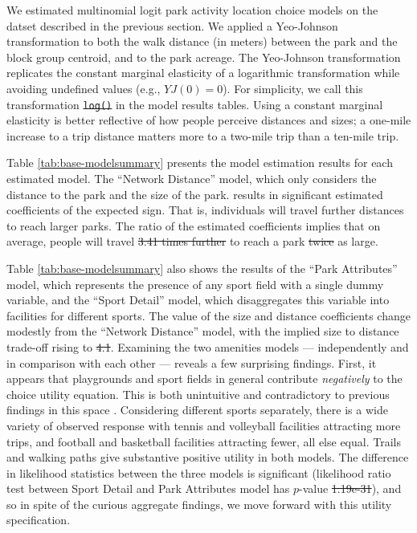 \documentclass[3p, authoryear, review]{elsarticle} %
\providecommand{\DIFaddtex}[1]{{\protect\color{blue}\uwave{#1}}} %
\providecommand{\DIFdeltex}[1]{{\protect\color{red}\sout{#1}}}                      %
\providecommand{\DIFaddbegin}{} %
\providecommand{\DIFaddend}{} %
\providecommand{\DIFdelbegin}{} %
\providecommand{\DIFdelend}{} %
\providecommand{\DIFadd}[1]{\texorpdfstring{\DIFaddtex{#1}}{#1}} %
\providecommand{\DIFdel}[1]{\texorpdfstring{\DIFdeltex{#1}}{}} %
\newcommand{\DIFscaledelfig}{0.5}
\newlength{\DIFdelgraphicswidth} %
\newlength{\DIFdelgraphicsheight} %
\newcommand{\DIFaddincludegraphics}[2][]{{\color{blue}\fbox{\DIFOincludegraphics[#1]{#2}}}} %
\newcommand{\DIFdelincludegraphics}[2][]{%
\sbox{\DIFdelgraphicsbox}{\DIFOincludegraphics[#1]{#2}}%
\settoboxwidth{\DIFdelgraphicswidth}{\DIFdelgraphicsbox} %
\settoboxtotalheight{\DIFdelgraphicsheight}{\DIFdelgraphicsbox} %
\scalebox{\DIFscaledelfig}{%
\parbox[b]{\DIFdelgraphicswidth}{\usebox{\DIFdelgraphicsbox}\\[-\baselineskip] \rule{\DIFdelgraphicswidth}{0em}}\llap{\resizebox{\DIFdelgraphicswidth}{\DIFdelgraphicsheight}{%
\setlength{\unitlength}{\DIFdelgraphicswidth}%
\begin{picture}(1,1)%
\thicklines\linethickness{2pt} %
{\color[rgb]{1,0,0}\put(0,0){\framebox(1,1){}}}%
{\color[rgb]{1,0,0}\put(0,0){\line( 1,1){1}}}%
{\color[rgb]{1,0,0}\put(0,1){\line(1,-1){1}}}%
\end{picture}%
}\hspace*{3pt}}} %
} %
\DeclareRobustCommand{\DIFaddbegin}{\DIFOaddbegin \let\includegraphics\DIFaddincludegraphics} %
\DeclareRobustCommand{\DIFaddend}{\DIFOaddend \let\includegraphics\DIFOincludegraphics} %
\DeclareRobustCommand{\DIFdelbegin}{\DIFOdelbegin \let\includegraphics\DIFdelincludegraphics} %
\DeclareRobustCommand{\DIFdelend}{\DIFOaddend \let\includegraphics\DIFOincludegraphics} %
\begin{document}
We estimated multinomial logit park activity location choice models on the
datset described in the previous section. We applied a Yeo-Johnson
transformation \citep{Yeo2000} to both the walk distance (in meters) between the
park and the block group centroid, and to the park acreage. The Yeo-Johnson
transformation replicates the constant marginal elasticity of a logarithmic
transformation while avoiding undefined values (e.g., \(YJ(0) = 0\)). For
simplicity, we call this transformation \DIFdelbegin \texttt{\DIFdel{log()}} %
\DIFdelend \DIFaddbegin \DIFadd{\(\log()\) }\DIFaddend in the model results tables.
Using a constant marginal elasticity is better reflective of how people perceive
distances and sizes; a one-mile increase to a trip distance matters more to a
two-mile trip than a ten-mile trip.

Table \ref{tab:base-modelsummary} presents the model estimation results for
each estimated model. The ``Network Distance'' model, which only considers the
distance to the park and the size of the park. results in significant estimated
coefficients of the expected sign. That is, individuals will travel further
distances to reach larger parks. The ratio of the estimated coefficients implies
that on average, people will travel \DIFdelbegin \DIFdel{3.41 times further }\DIFdelend \DIFaddbegin \DIFadd{twice as far }\DIFaddend to reach a park \DIFdelbegin \DIFdel{twice }\DIFdelend \DIFaddbegin \DIFadd{3.47
times }\DIFaddend as large.

Table \ref{tab:base-modelsummary} also shows the results of the ``Park
Attributes'' model, which represents the presence of any sport field with a
single dummy variable, and the ``Sport Detail'' model, which disaggregates this
variable into facilities for different sports. The value of the size and
distance coefficients change modestly from the ``Network Distance'' model, with
the implied size to distance trade-off rising to \DIFdelbegin \DIFdel{4.1}\DIFdelend \DIFaddbegin \DIFadd{4.16}\DIFaddend . Examining
the two amenities models --- independently and in comparison with each other ---
reveals a few surprising findings. First, it appears that playgrounds and sport
fields in general contribute \emph{negatively} to the choice utility equation. This
is both unintuitive and contradictory to previous findings in this space \citep[e.g.,][]{Kinnell2006}. Considering different sports separately, there is a wide variety
of observed response with tennis and volleyball facilities attracting more
trips, and football and basketball facilities attracting fewer, all else equal.
Trails and walking paths give substantive positive utility in both models. The
difference in likelihood statistics between the three models is significant
(likelihood ratio test between Sport Detail and Park Attributes model has
\(p\)-value \DIFdelbegin \DIFdel{1.19e-31}\DIFdelend \DIFaddbegin \DIFadd{2.68e-06}\DIFaddend ), and so in spite of the curious aggregate findings,
we move forward with this utility specification.
\end{document}
